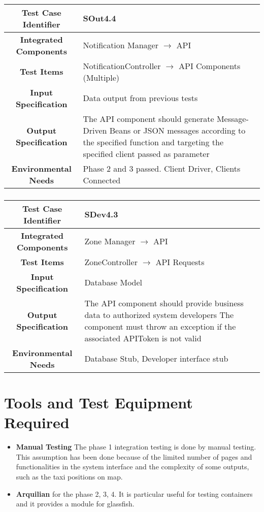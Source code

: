 \documentclass[11pt, a4paper,titlepage]{article}
\begin{document}
			\subsubsection{}
			\begin{tabularx}{\textwidth}{| c|X|}
				\hline \textbf{Test Case Identifier} & \label{SOut4.4 }SOut4.4 \\
				\hline \textbf{Integrated Components} & Notification Manager $\rightarrow $ API \\
				\hline \textbf{Test Items} & NotificationController $\rightarrow $ API Components (Multiple) \\
				\hline \textbf{Input Specification} & Data output from previous tests \\
				\hline \textbf{Output Specification} & The API component should generate Message-Driven Beans or JSON messages according to the specified function and targeting the specified client passed as parameter \\
				\hline \textbf{Environmental Needs} & Phase 2 and 3 passed. Client Driver, Clients Connected \\
				\hline
			\end{tabularx}
			\newline
			\subsubsection{}
			\begin{tabularx}{\textwidth}{| c|X|}
				\hline \textbf{Test Case Identifier} & \label{SDev4.3}SDev4.3 \\
				\hline \textbf{Integrated Components} & Zone Manager $\rightarrow $ API \\
				\hline \textbf{Test Items} & ZoneController $\rightarrow $ API Requests \\
				\hline \textbf{Input Specification} & Database Model \\
				\hline \textbf{Output Specification} & The API component should provide business data to authorized system developers
				\newline The component must throw an exception if the associated APIToken is not valid \\
				\hline \textbf{Environmental Needs} & Database Stub, Developer interface stub \\
				\hline
			\end{tabularx}
			\newline
			
	\newpage
	\section{Tools and Test Equipment Required}
	\begin{itemize}
		\item \textbf{Manual Testing} The phase 1 integration testing is done by manual testing. This assumption has been done because of the limited number of pages and functionalities in the system interface and the complexity of some outputs, such as the taxi positions on map.
		\item \textbf{Arquilian} for the phase 2, 3, 4. It is particular useful for testing containers and it provides a module for glassfish.
	\end{itemize}
\end{document}
